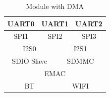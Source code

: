 
\begin{table}[H]
    \centering
    \caption{Module with DMA}
    \label{table:Module_with_DMA}
    \begin{tabular}{|*{6}{c|}}

    \hline
    \multicolumn{2}{|c|}{UART0} & \multicolumn{2}{c|}{UART1} & \multicolumn{2}{c|}{UART2} \\
    \hline
    \hline
    \multicolumn{2}{|c|}{SPI1} & \multicolumn{2}{c|}{SPI2} & \multicolumn{2}{c|}{SPI3} \\
    \hline
    \hline
    \multicolumn{3}{|c|}{I2S0} & \multicolumn{3}{c|}{I2S1} \\
    \hline
    \hline
    \multicolumn{3}{|c|}{SDIO Slave} & \multicolumn{3}{c|}{SDMMC} \\
    \hline
    \hline
    \multicolumn{6}{|c|}{EMAC} \\
    \hline
    \hline
    \multicolumn{3}{|c|}{BT} & \multicolumn{3}{c|}{WIFI} \\
    \hline
        
    \end{tabular}
\end{table}